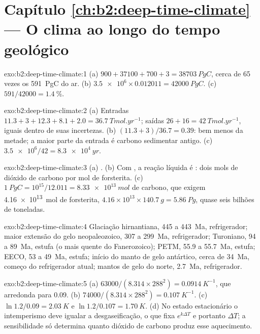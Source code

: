 \section*{Capítulo \ref{ch:b2:deep-time-climate} --- O clima ao longo do tempo geológico}

\begin{solution}{exo:b2:deep-time-climate:1}
(a) $900 + 37100 + 700 + 3 = \qty{38703}{PgC}$, cerca de 65 vezes os \qty{591}{PgC} do ar.
(b) $\num{3.5e6}\times0.012011 = \qty{42000}{PgC}$. (c) $591/42000 = \qty{1.4}{\percent}$.
\end{solution}

\begin{solution}{exo:b2:deep-time-climate:2}
(a) Entradas $11.3 + 3 + 12.3 + 8.1 + 2.0 = \qty{36.7}{Tmol.yr^{-1}}$; saídas $26 + 16 =
\qty{42}{Tmol.yr^{-1}}$, iguais dentro de suas incertezas. (b) $(11.3 + 3)/36.7 = 0.39$: bem
menos da metade; a maior parte da entrada é carbono sedimentar antigo. (c) $\num{3.5e6}/42 = \qty{8.3e4}{yr}$.
\end{solution}

\begin{solution}{exo:b2:deep-time-climate:3}
(a) . (b) Com , a reação líquida é : dois mols
de dióxido de carbono por mol de forsterita. (c) $\qty{1}{PgC} = 10^{15}/12.011 =
\qty{8.33e13}{mol}$ de carbono, que exigem \qty{4.16e13}{mol} de forsterita, $4.16\times10^{13}
\times\qty{140.7}{g} = \qty{5.86}{Pg}$, quase seis bilhões de toneladas.
\end{solution}

\begin{solution}{exo:b2:deep-time-climate:4}
Glaciação hirnantiana, 445 a \qty{443}{Ma}, refrigerador; maior extensão do gelo neopaleozoico, 307 a
\qty{299}{Ma}, refrigerador; Turoniano, 94 a \qty{89}{Ma}, estufa (o mais quente do Fanerozoico);
PETM, 55.9 a \qty{55.7}{Ma}, estufa; EECO, 53 a \qty{49}{Ma}, estufa; início do manto de gelo
antártico, cerca de \qty{34}{Ma}, começo do refrigerador atual; mantos de gelo do norte,
\qty{2.7}{Ma}, refrigerador.
\end{solution}

\begin{solution}{exo:b2:deep-time-climate:5}
(a) $63000/(8.314\times288^2) = \qty{0.0914}{K^{-1}}$, que arredonda para 0.09. (b) $74000/(8.314
\times288^2) = \qty{0.107}{K^{-1}}$. (c) $\ln1.2/0.09 = \qty{2.03}{K}$ e $\ln 1.2/0.107 =
\qty{1.70}{K}$. (d) No estado estacionário o intemperismo deve igualar a desgaseificação, o que fixa $e^{k
\Delta T}$ e portanto $\Delta T$; a sensibilidade só determina quanto dióxido de carbono produz esse
aquecimento.
\end{solution}

